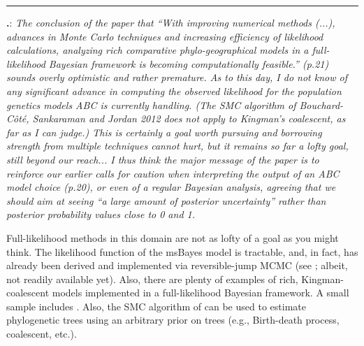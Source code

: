\documentclass[12pt]{article}
\newcounter{commentCounter}
\newcommand{\revcomment}[1]{{\addtocounter{commentCounter}{1}}
    \medskip \hrule \noindent
\textbf{\arabic{section}.\arabic{commentCounter}}: {\sl #1}\par\xspace}
\newcommand{\response}[1]{{\addtolength{\leftskip}{0.25in} #1\par}\xspace}
\begin{document}
\revcomment{
    The conclusion of the paper that ``With improving numerical methods (...),
    advances in Monte Carlo techniques and increasing efficiency of likelihood
    calculations, analyzing rich comparative phylo-geographical models in a
    full-likelihood Bayesian framework is becoming computationally feasible.''
    (p.21) sounds overly optimistic and rather premature. As to this day, I do
    not know of any significant advance in computing the observed likelihood
    for the population genetics models ABC is currently handling. (The SMC
    algorithm of Bouchard-C\^{o}t\'{e}, Sankaraman and Jordan 2012 does not apply to
    Kingman's coalescent, as far as I can judge.) This is certainly a goal
    worth pursuing and borrowing strength from multiple techniques cannot hurt,
    but it remains so far a lofty goal, still beyond our reach... I thus think
    the major message of the paper is to reinforce our earlier calls for
    caution when interpreting the output of an ABC model choice (p.20), or even
    of a regular Bayesian analysis, agreeing that we should aim at seeing ``a
    large amount of posterior uncertainty'' rather than posterior probability
    values close to 0 and 1.
}
\response{
    Full-likelihood methods in this domain are not as lofty of a goal as you
    might think. The likelihood function of the msBayes model is tractable,
    and, in fact, has already been derived and implemented via reversible-jump
    MCMC (see \cite{JeetDiss}; albeit, not readily available yet).
    Also, there are plenty of examples of rich, Kingman-coalescent models
    implemented in a full-likelihood Bayesian framework.
    A small sample includes \cite{Drummond2005,Drummond2008,Drummond2002,Kuhner1995,Hey2007,Hey2010,Bryant2012,Shapiro2011,Vaughan2014,Heled2010,Lemey2009,Lemey2010,Pybus2012,Baele2012,Minin2008beast,Bloomquist2010}.
    Also, the SMC algorithm of \cite{Jordan2012} can be used to estimate
    phylogenetic trees using an arbitrary prior on trees (e.g., Birth-death
    process, coalescent, etc.).
}



\end{document}
